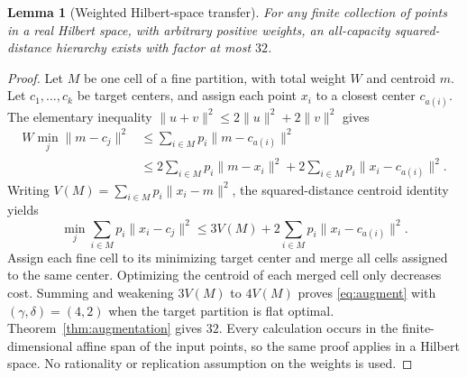 \documentclass[11pt]{article}
\newtheorem{lemma}[theorem]{Lemma}
\theoremstyle{definition}\newtheorem{definition}[theorem]{Definition}
\theoremstyle{remark}\newtheorem{remark}[theorem]{Remark}
\begin{document}
\begin{lemma}[Weighted Hilbert-space transfer]
\label{lem:hilbert}
For any finite collection of points in a real Hilbert space, with arbitrary positive weights, an all-capacity squared-distance hierarchy exists with factor at most $32$.
\end{lemma}
\begin{proof}
Let $M$ be one cell of a fine partition, with total weight $W$ and centroid $m$. Let $c_1,\ldots,c_k$ be target centers, and assign each point $x_i$ to a closest center $c_{a(i)}$. The elementary inequality $\|u+v\|^2\le2\|u\|^2+2\|v\|^2$ gives
\begin{align*}
W\min_j\|m-c_j\|^2
&\le\sum_{i\in M}p_i\|m-c_{a(i)}\|^2\\
&\le 2\sum_{i\in M}p_i\|m-x_i\|^2
 +2\sum_{i\in M}p_i\|x_i-c_{a(i)}\|^2.
\end{align*}
Writing $V(M)=\sum_{i\in M}p_i\|x_i-m\|^2$, the squared-distance centroid identity yields
\[
\min_j\sum_{i\in M}p_i\|x_i-c_j\|^2
\le3V(M)+2\sum_{i\in M}p_i\|x_i-c_{a(i)}\|^2.
\]
Assign each fine cell to its minimizing target center and merge all cells assigned to the same center. Optimizing the centroid of each merged cell only decreases cost. Summing and weakening $3V(M)$ to $4V(M)$ proves \eqref{eq:augment} with $(\gamma,\delta)=(4,2)$ when the target partition is flat optimal. Theorem~\ref{thm:augmentation} gives $32$. Every calculation occurs in the finite-dimensional affine span of the input points, so the same proof applies in a Hilbert space. No rationality or replication assumption on the weights is used.
\end{proof}
\end{document}
